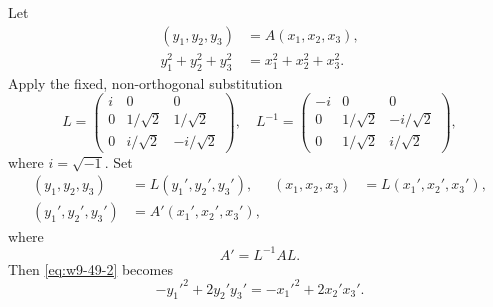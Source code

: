 \documentclass[11pt,a4paper]{book}
\begin{document}
Let
\begin{align}
 (y_1,y_2,y_3)&=A(x_1,x_2,x_3),\label{eq:w9-49-1}\\
 y_1^2+y_2^2+y_3^2&=x_1^2+x_2^2+x_3^2.\label{eq:w9-49-2}
\end{align}
Apply the fixed, non-orthogonal substitution
\begin{equation}\label{eq:w9-L}
 L=\begin{pmatrix}
 i&0&0\\
 0&1/\sqrt2&1/\sqrt2\\
 0&i/\sqrt2&-i/\sqrt2
 \end{pmatrix},
\quad
 L^{-1}=\begin{pmatrix}
 -i&0&0\\
 0&1/\sqrt2&-i/\sqrt2\\
 0&1/\sqrt2&i/\sqrt2
 \end{pmatrix},
\end{equation}
where $i=\sqrt{-1}$.  Set
\begin{align}
 (y_1,y_2,y_3)&=L(y_1',y_2',y_3'),
 & (x_1,x_2,x_3)&=L(x_1',x_2',x_3'),\label{eq:w9-49-4}\\
 (y_1',y_2',y_3')&=A'(x_1',x_2',x_3'),\label{eq:w9-49-5}
\end{align}
where
\begin{equation}\label{eq:w9-Apr}
 A'=L^{-1}AL.
\end{equation}
Then \eqref{eq:w9-49-2} becomes
\begin{equation}\label{eq:w9-nullquad}
 -y_1'^2+2y_2'y_3'=-x_1'^2+2x_2'x_3'.
\end{equation}
\end{document}
